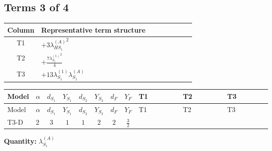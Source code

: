 \documentclass[8pt]{article}
\begin{document}
\begin{landscape}
\subsection*{Terms 3 of 4}
\begin{center}
\begin{tabular}{@{}c >{\raggedright\arraybackslash}p{0.82\linewidth}@{}}
\toprule
Column & Representative term structure \\
\midrule
T1 & \(\displaystyle +3 {\lambda_{HS_1}^{(A)}}^2\) \\
\midrule
T2 & \(\displaystyle +\frac{7 {\lambda_{S_1}^{(1)}}^2}{4}\) \\
\midrule
T3 & \(\displaystyle +13 {\lambda_{S_1}^{(1)}} {\lambda_{S_1}^{(A)}}\) \\
\midrule
\bottomrule
\end{tabular}
\end{center}
\smallskip
\tiny
\begin{longtable}{@{}llcccccc >{\raggedright\arraybackslash}p{0.21\linewidth} >{\raggedright\arraybackslash}p{0.21\linewidth} >{\raggedright\arraybackslash}p{0.21\linewidth}@{}}
\toprule
Model & $\alpha$ & $d_{S_1}$ & $Y_{S_1}$ & $d_{S_2}$ & $Y_{S_2}$ & $d_F$ & $Y_F$ & T1 & T2 & T3 \\
\midrule
\endfirsthead
\toprule
Model & $\alpha$ & $d_{S_1}$ & $Y_{S_1}$ & $d_{S_2}$ & $Y_{S_2}$ & $d_F$ & $Y_F$ & T1 & T2 & T3 \\
\midrule
\endhead
T3-D & $2$ & $3$ & $1$ & $1$ & $2$ & $2$ & $\frac{3}{2}$ & \scriptsize\adjustbox{max width=\linewidth}{$\begin{gathered} +3 {\lambda_{HS_1}^{(A)}}^2\end{gathered}$} & \scriptsize\adjustbox{max width=\linewidth}{$\begin{gathered} +\frac{7 {\lambda_{S_1}^{(1)}}^2}{4}\end{gathered}$} & \scriptsize\adjustbox{max width=\linewidth}{$\begin{gathered} +13 {\lambda_{S_1}^{(1)}} {\lambda_{S_1}^{(A)}}\end{gathered}$} \\
\midrule
\bottomrule
\end{longtable}
\clearpage
\noindent\textbf{Quantity: }$\lambda_{S_1}^{(A)}$\par\smallskip

\end{landscape}
\end{document}
